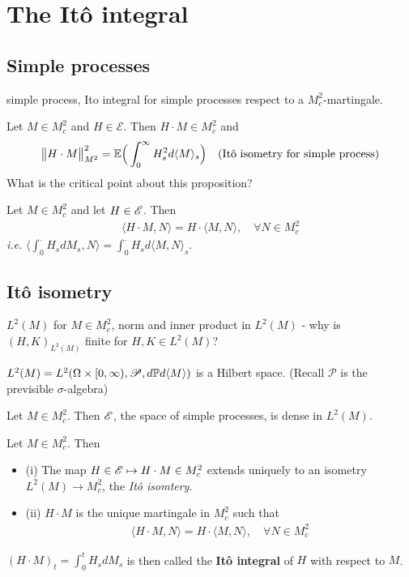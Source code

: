 \documentclass[10pt,a4paper]{article}
\renewenvironment{i}
{\begin{itemize} 
	}%
	{\end{itemize}
}
\begin{document}
\section{The It\^o integral}

\subsection{Simple processes}

 simple process, Ito integral for simple processes respect to a $M_c^2$-martingale.
\s

\prop Let $M \in M_c^2$ and $H\in \mathscr{E}$. Then $H\cdot M\in M_c^2$ and
\begin{align*}
\bigl\lVert H \cdot M\bigr\rVert_{M^2}^2 = \mathbb{E} \Big( \int_0^{\infty} H_s^2 d\langle M \rangle_s \Big) \quad \text{(It\^o isometry for simple process)}
\end{align*}
What is the critical point about this proposition?
\s

\prop Let $M\in M_c^2$ and let $H\in \mathscr{E}$. Then
\begin{align*}
\langle H\cdot M, N \rangle = H \cdot \langle M, N \rangle, \quad \forall N \in M_c^2
\end{align*}
\textit{i.e.} $\langle \int_0^{\cdot} H_s dM_s, N\rangle = \int_0^{\cdot} H_s d\langle M, N \rangle_s$.

\subsection{It\^o isometry}

 $L^2(M)$ for $M\in M_c^2$, norm and inner product in $L^2(M)$ - why is $(H,K)_{L^2(M)}$ finite for $H,K\in L^2(M)$?
\s

\fact $L^2(M) = L^2(\Omega \times [0, \infty), \mathscr{P}, d\mathbb{P} d\langle M \rangle)$ is a Hilbert space. (Recall $\mathscr{P}$ is the previsible $\sigma$-algebra)
\s

\prop Let $M\in M_c^2$. Then $\mathscr{E}$, the space of simple processes, is dense in $L^2(M)$.
\s

 Let $M\in M_c^2$. Then
\begin{i}
\item[(i)] The map $H\in \mathscr{E}\mapsto H\cdot M \in M_c^2$ extends uniquely to an isometry $L^2(M) \rightarrow M_c^2$, the \emph{It\^o isomtery}.
\item[(ii)] $H\cdot M$ is the unique martingale in $M_c^2$ such that
\begin{align*}
\langle H\cdot M, N \rangle = H\cdot \langle M, N\rangle, \quad \forall N \in M_c^2
\end{align*}
\end{i}
$(H\cdot M)_t = \int_0^t H_s dM_s$ is then called the \textbf{It\^o integral} of $H$ with respect to $M$.
\s
\end{document}
